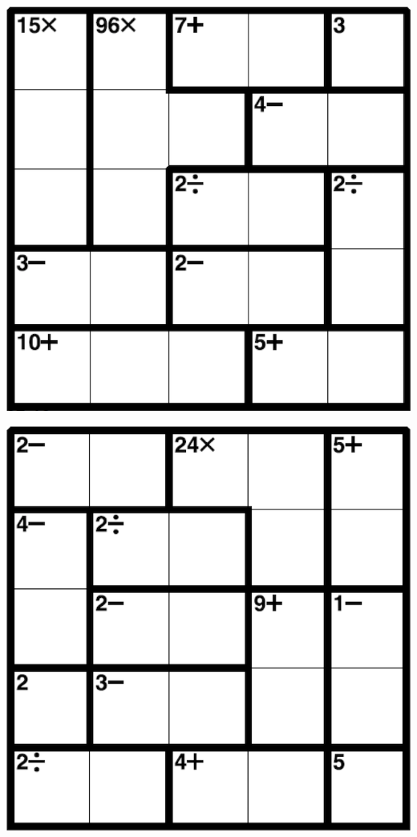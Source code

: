 
\includegraphics[scale=1]{Gambar/Lampiran/5x5_23.png}

\includegraphics[scale=1]{Gambar/Lampiran/5x5_24.png}
